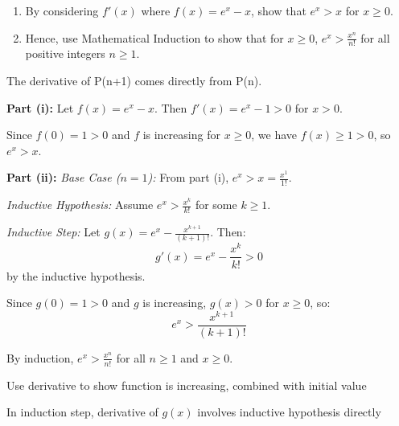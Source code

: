 \begin{problem}
\begin{enumerate}
    \item[(i)] By considering $f'(x)$ where $f(x) = e^x - x$, show that $e^x > x$ for $x \ge 0$.
    \item[(ii)] Hence, use Mathematical Induction to show that for $x \ge 0$, $e^x > \frac{x^n}{n!}$ for all positive integers $n \ge 1$.
\end{enumerate}
\end{problem}

\begin{hint}
The derivative of P(n+1) comes directly from P(n).
\end{hint}

\begin{solution}
\textbf{Part (i):} Let $f(x) = e^x - x$. Then $f'(x) = e^x - 1 > 0$ for $x > 0$.

Since $f(0) = 1 > 0$ and $f$ is increasing for $x \geq 0$, we have $f(x) \geq 1 > 0$, so $e^x > x$.

\textbf{Part (ii):} 
\textit{Base Case ($n=1$):} From part (i), $e^x > x = \frac{x^1}{1!}$.

\textit{Inductive Hypothesis:} Assume $e^x > \frac{x^k}{k!}$ for some $k \geq 1$.

\textit{Inductive Step:} Let $g(x) = e^x - \frac{x^{k+1}}{(k+1)!}$. Then:
\[ g'(x) = e^x - \frac{x^k}{k!} > 0 \]
by the inductive hypothesis.

Since $g(0) = 1 > 0$ and $g$ is increasing, $g(x) > 0$ for $x \geq 0$, so:
\[ e^x > \frac{x^{k+1}}{(k+1)!} \]

By induction, $e^x > \frac{x^n}{n!}$ for all $n \geq 1$ and $x \geq 0$.
\end{solution}

\begin{takeaways}
\item Use derivative to show function is increasing, combined with initial value
\item In induction step, derivative of $g(x)$ involves inductive hypothesis directly
\end{takeaways}
